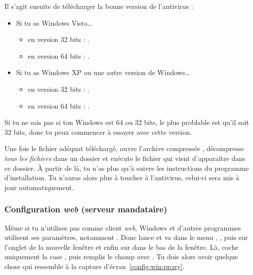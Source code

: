 Il s'agit ensuite de télécharger la bonne version de l'antivirus :
\begin{itemize}

\item Si tu as Windows Vista\dots
\begin{itemize}
\item en version 32 bits : .
\item en version 64 bits : .
\end{itemize}

\item Si tu as Windows XP ou une autre version de Windows\dots
\begin{itemize}
\item en version 32 bits : .
\item en version 64 bits : .
\end{itemize}
\end{itemize}

Si tu ne sais pas si ton Windows est 64 ou 32 bits, le plus problable est qu'il
soit 32 bits, donc tu peux commencer à essayer avec cette version.

Une fois le fichier adéquat téléchargé, ouvre l'archive compressée , décompresse \emph{tous les fichiers} dans un dossier et exécute le fichier  qui vient d'apparaître dans ce dossier. \`A partir de là, tu n'as plus qu'à suivre les instructions du
programme d'installation. Tu n'auras alors plus à toucher à l'antivirus, celui-ci sera mis à jour automatiquement.

\subsubsection{Configuration \emph{web} (serveur mandataire)}


Même si tu n'utilises pas  comme client \emph{web}, Windows et d'autres programmes
utilisent ses paramètres, notamment . Donc lance  et va
dans le menu , , puis sur l'onglet  de la
nouvelle fenêtre et enfin sur  dans le bas de la fenêtre. Là, coche
uniquement la case , puis remplis le champ
 avec . Tu dois alors avoir quelque chose qui
ressemble à la capture d'écran~\ref{config:win:proxy}.

